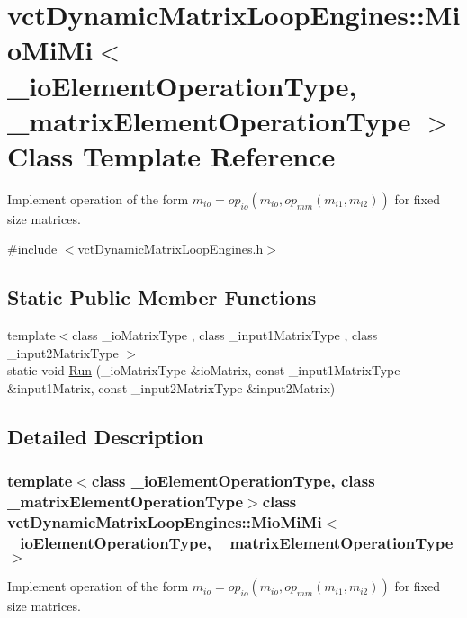 \hypertarget{classvct_dynamic_matrix_loop_engines_1_1_mio_mi_mi}{\section{vct\-Dynamic\-Matrix\-Loop\-Engines\-:\-:Mio\-Mi\-Mi$<$ \-\_\-io\-Element\-Operation\-Type, \-\_\-matrix\-Element\-Operation\-Type $>$ Class Template Reference}
\label{classvct_dynamic_matrix_loop_engines_1_1_mio_mi_mi}
}


Implement operation of the form $m_{io} = op_{io}(m_{io}, op_{mm}(m_{i1}, m_{i2}))$ for fixed size matrices.  




{\ttfamily \#include $<$vct\-Dynamic\-Matrix\-Loop\-Engines.\-h$>$}

\subsection*{Static Public Member Functions}
\begin{DoxyCompactItemize}
\item 
{\footnotesize template$<$class \-\_\-io\-Matrix\-Type , class \-\_\-input1\-Matrix\-Type , class \-\_\-input2\-Matrix\-Type $>$ }\\static void \hyperlink{classvct_dynamic_matrix_loop_engines_1_1_mio_mi_mi_a504e413cf784f3211d8e5c140df6c204}{Run} (\-\_\-io\-Matrix\-Type \&io\-Matrix, const \-\_\-input1\-Matrix\-Type \&input1\-Matrix, const \-\_\-input2\-Matrix\-Type \&input2\-Matrix)
\end{DoxyCompactItemize}


\subsection{Detailed Description}
\subsubsection*{template$<$class \-\_\-io\-Element\-Operation\-Type, class \-\_\-matrix\-Element\-Operation\-Type$>$class vct\-Dynamic\-Matrix\-Loop\-Engines\-::\-Mio\-Mi\-Mi$<$ \-\_\-io\-Element\-Operation\-Type, \-\_\-matrix\-Element\-Operation\-Type $>$}

Implement operation of the form $m_{io} = op_{io}(m_{io}, op_{mm}(m_{i1}, m_{i2}))$ for fixed size matrices. 

